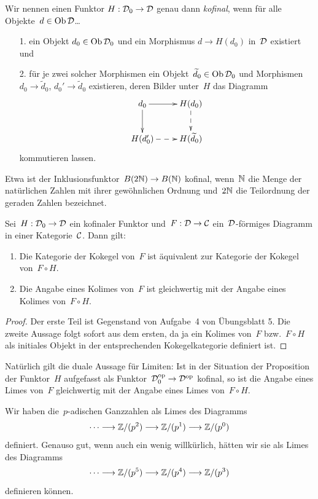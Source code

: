 \begin{defn}
Wir nennen einen Funktor $H : \mathcal{D}_0 \to \mathcal{D}$ genau dann \emph{kofinal}, wenn
für alle Objekte~$d \in \operatorname{Ob}\mathcal{D}$\ldots
\begin{enumerate}
\item[1.] ein Objekt $d_0 \in \operatorname{Ob}\mathcal{D}_0$ und ein Morphismus $d \to
H(d_0)$ in~$\mathcal{D}$ existiert und
\item[2.] für je zwei solcher Morphismen ein Objekt~$\widetilde d_0 \in \operatorname{Ob}\mathcal{D}_0$ und
Morphismen $d_0 \to \widetilde d_0$, $d_0' \to \widetilde d_0$ existieren, deren Bilder
unter~$H$ das Diagramm
\[ \xymatrix{
  d_0 \ar[r] \ar[d] & H(d_0) \ar@{-->}[d] \\
  H(d_0') \ar@{-->}[r] & H(\widetilde d_0)
} \]
kommutieren lassen.
\end{enumerate}
\end{defn}

Etwa ist der Inklusionsfunktor~$B (2\mathbb{N}) \to B(\mathbb{N})$ kofinal, wenn~$\mathbb{N}$ die
Menge der natürlichen Zahlen mit ihrer gewöhnlichen Ordnung und~$2\mathbb{N}$ die
Teilordnung der geraden Zahlen bezeichnet.

\begin{prop}
Sei~$H : \mathcal{D}_0 \to \mathcal{D}$ ein kofinaler Funktor und~$F : \mathcal{D} \to \mathcal{C}$
ein~$\mathcal{D}$-förmiges Diagramm in einer Kategorie~$\mathcal{C}$. Dann gilt:
\begin{enumerate}
\item Die Kategorie der Kokegel von~$F$ ist äquivalent zur Kategorie der
Kokegel von~$F \circ H$.
\item Die Angabe eines Kolimes von~$F$ ist gleichwertig mit der Angabe eines
Kolimes von~$F \circ H$.
\end{enumerate}
\end{prop}
\begin{proof}
Der erste Teil ist Gegenstand von Aufgabe~4 von Übungsblatt 5. Die zweite
Aussage folgt sofort aus dem ersten, da ja ein Kolimes von~$F$ bzw.~$F \circ H$
als initiales Objekt in der entsprechenden Kokegelkategorie definiert ist.
\end{proof}

Natürlich gilt die duale Aussage für Limiten: Ist in der Situation der
Proposition der Funktor~$H$ aufgefasst als Funktor~$\mathcal{D}_0^{\mathrm{op}} \to \mathcal{D}^{\mathrm{op}}$
kofinal, so ist die Angabe eines Limes von~$F$ gleichwertig mit der Angabe
eines Limes von~$F \circ H$.

\begin{bsp}Wir haben die~$p$-adischen Ganzzahlen als Limes des Diagramms
\[ \cdots \longrightarrow \mathbb{Z}/(p^2) \longrightarrow \mathbb{Z}/(p^1) \longrightarrow \mathbb{Z}/(p^0) \]
definiert. Genauso gut, wenn auch ein wenig willkürlich, hätten wir sie als
Limes des Diagramms
\[ \cdots \longrightarrow \mathbb{Z}/(p^5) \longrightarrow \mathbb{Z}/(p^4) \longrightarrow \mathbb{Z}/(p^3) \]
definieren können.\end{bsp}



